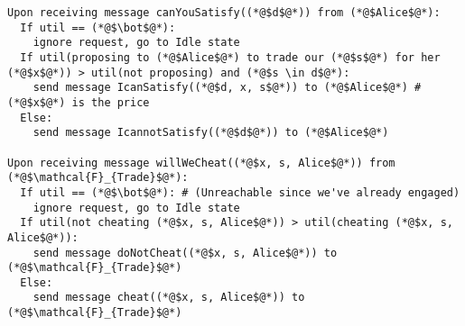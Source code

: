 \begin{lstlisting}[label=satprot, style=numbers]
Upon receiving message canYouSatisfy((*@$d$@*)) from (*@$Alice$@*):
  If util == (*@$\bot$@*):
    ignore request, go to Idle state
  If util(proposing to (*@$Alice$@*) to trade our (*@$s$@*) for her (*@$x$@*)) > util(not proposing) and (*@$s \in d$@*):
    send message IcanSatisfy((*@$d, x, s$@*)) to (*@$Alice$@*) # (*@$x$@*) is the price
  Else:
    send message IcannotSatisfy((*@$d$@*)) to (*@$Alice$@*)

Upon receiving message willWeCheat((*@$x, s, Alice$@*)) from (*@$\mathcal{F}_{Trade}$@*):
  If util == (*@$\bot$@*): # (Unreachable since we've already engaged)
    ignore request, go to Idle state
  If util(not cheating (*@$x, s, Alice$@*)) > util(cheating (*@$x, s, Alice$@*)):
    send message doNotCheat((*@$x, s, Alice$@*)) to (*@$\mathcal{F}_{Trade}$@*)
  Else:
    send message cheat((*@$x, s, Alice$@*)) to (*@$\mathcal{F}_{Trade}$@*)
\end{lstlisting}

